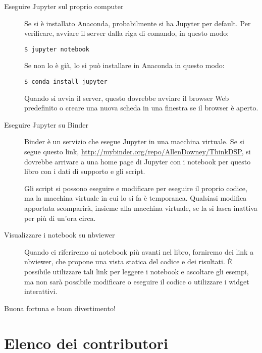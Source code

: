 \documentclass[12pt,a4paper]{book}
\begin{document}
\begin{description} 

\item[Eseguire Jupyter sul proprio computer]

Se si è installato Anaconda, probabilmente si ha Jupyter per default. Per verificare, avviare il server dalla riga di comando, in questo modo:

\begin{verbatim} 
$ jupyter notebook
 \end{verbatim} 

Se non lo è già, lo si può installare in Anaconda in questo modo:

\begin{verbatim} 
$ conda install jupyter
 \end{verbatim} 

Quando si avvia il server, questo dovrebbe avviare il browser Web predefinito o creare una nuova scheda in una finestra se il browser è aperto.

\item[Eseguire Jupyter su Binder]

Binder è un servizio che esegue Jupyter in una macchina virtuale. Se si segue questo link, \url{http://mybinder.org/repo/AllenDowney/ThinkDSP}, si dovrebbe arrivare a una home page di Jupyter con i notebook per questo libro con i dati di supporto e gli script.

Gli script si possono eseguire e modificare per eseguire il proprio codice, ma la macchina virtuale in cui lo si fa è temporanea. Qualsiasi modifica apportata scomparirà, insieme alla macchina virtuale, se la si lasca inattiva per più di un'ora circa.

\item[Visualizzare i notebook su nbviewer]

Quando ci riferiremo ai notebook più avanti nel libro, forniremo dei link a nbviewer, che propone una vista statica del codice e dei risultati. È possibile utilizzare tali link per leggere i notebook e ascoltare gli esempi, ma non sarà possibile modificare o eseguire il codice o utilizzare i widget interattivi.

\end{description} 

Buona fortuna e buon divertimento!

\section*{Elenco dei contributori} 
\end{document}
